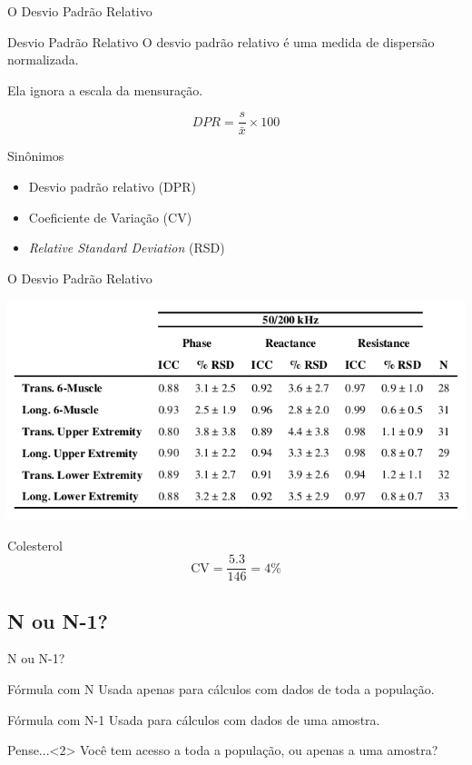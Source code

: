\documentclass{beamer}
\begin{document}
\begin{frame}{\scriptsize O Desvio Padrão Relativo}
  \begin{block}{Desvio Padrão Relativo}
    \footnotesize
    O desvio padrão relativo é uma medida de dispersão \alert{normalizada}.

    \bigskip
    Ela ignora a escala da mensuração.

    $$DPR = \frac{s}{\bar{x}}\times 100$$
  \end{block}
  \begin{exampleblock}{Sinônimos}
    \footnotesize
    \begin{itemize}
    \footnotesize
    \item Desvio padrão relativo (DPR)
    \item Coeficiente de Variação (CV)
    \item {\em Relative Standard Deviation} (RSD)
  \end{itemize}
  \end{exampleblock}
\end{frame}

\begin{frame}{\scriptsize O Desvio Padrão Relativo}
  \begin{center}
    \includegraphics[width=\textwidth]{Cap3/RSD1}
  \end{center}
  \begin{exampleblock}{Colesterol}
    \footnotesize
    $$\text{CV} = \frac{5.3}{146} = 4\%$$
  \end{exampleblock}
\end{frame}

\subsection{N ou N-1?}

\begin{frame}{\scriptsize N ou N-1?}
  \begin{block}{Fórmula com N}
    \footnotesize
    Usada apenas para cálculos com dados de toda a população.
  \end{block}
  \begin{block}{Fórmula com N-1}
    \footnotesize
    Usada para cálculos com dados de uma amostra.
  \end{block}
  \begin{block}{Pense...}<2>
    \footnotesize
      Você tem acesso a toda a população, ou apenas a uma amostra?
  \end{block}
\end{frame}
\end{document}
